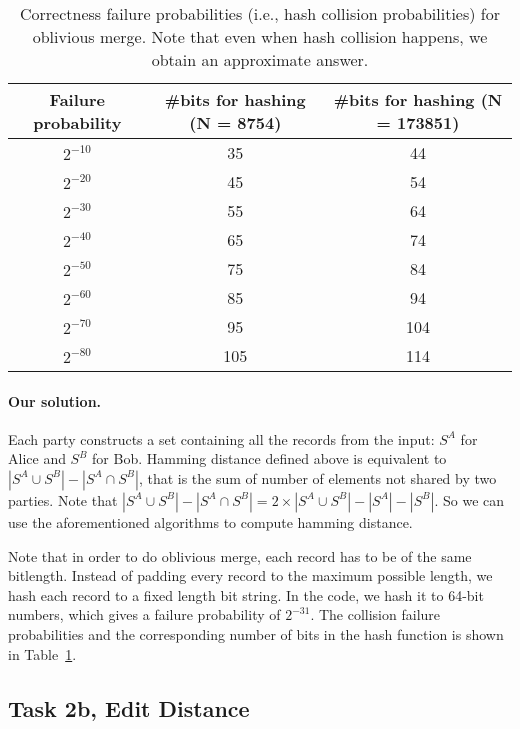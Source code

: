 \begin{table}[t]
  \centering
  \begin{tabular}{c|c|c}
    Failure probability&  \#bits for hashing (N = 8754)   & \#bits for hashing (N = 173851) \\ \hline
    $2^{-10}$ & 35 & 44 \\
    $2^{-20}$ &45 & 54 \\
    $2^{-30}$ & 55 & 64 \\
    $2^{-40}$ & 65& 74 \\
    $2^{-50}$ & 75& 84 \\
    $2^{-60}$ & 85 & 94 \\
    $2^{-70}$ & 95 & 104 \\
    $2^{-80}$ & 105 & 114 \\
  \end{tabular}
  \caption{Correctness failure probabilities (i.e., hash collision probabilities) 
for oblivious merge. 
Note that even when hash collision happens, we obtain an 
approximate answer.}
  \label{fig:failure-hashing}
\end{table}



\paragraph{Our solution.}
Each party constructs a set containing all the records from the input: $S^A$ for Alice and $S^B$ for Bob.
Hamming distance defined above is equivalent to $|S^A\cup S^B| - |S^A\cap S^B|$, that is the sum of number of elements not shared by two parties.
Note that $|S^A\cup S^B| - |S^A\cap S^B| = 2\times|S^A\cup S^B|-|S^A| - |S^B|$. So we can use the aforementioned algorithms to compute hamming distance.

Note that in order to do oblivious merge, each record has to be of the same bitlength. Instead of padding every record to the maximum possible length, we hash each
record to a fixed length bit string. In the code, we hash it to 64-bit numbers, which gives a failure probability of $2^{-31}$. The collision failure probabilities and the corresponding number of bits in the hash function is shown in Table~\ref{fig:failure-hashing}.

\subsection{Task 2b, Edit Distance}
